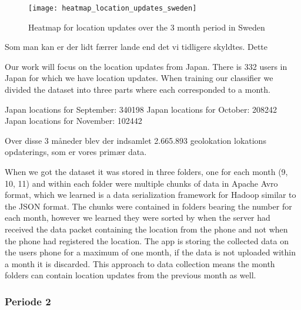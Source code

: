 \begin{figure}[H]
    \centering
    \texttt{[image: heatmap\_location\_updates\_sweden]}
    \caption{Heatmap for location updates over the 3 month period in Sweden}
    \label{fig:heatmap_swe}
\end{figure}



Som man kan er der lidt færrer lande end det vi tidligere skyldtes. Dette 

Our work will focus on the location updates from Japan. There is 332 users in Japan for which we have location updates.
When training our classifier we divided the dataset into three parts where each corresponded to a month.

Japan locations for September: 340198
Japan locations for October: 208242
Japan locations for November: 102442



Over disse 3 måneder blev der indsamlet 2.665.893 geolokation lokations opdaterings, som er vores primær data. 

When we got the dataset it was stored in three folders, one for each month (9, 10, 11) and within each folder were multiple chunks of data in Apache Avro format\cite{apacheavro}, which we learned is a data serialization framework for Hadoop similar to the JSON format. The chunks were contained in folders bearing the number for each month, however we learned they were sorted by when the server had received the data packet containing the location from the phone and not when the phone had registered the location. The app is storing the collected data on the users phone for a maximum of one month, if the data is not uploaded within a month it is discarded. This approach to data collection means the month folders can contain location updates from the previous month as well.


\subsubsection{Periode 2}